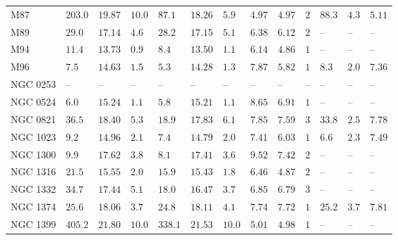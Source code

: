 \begin{table*}
\begin{center}
\begin{tabular}{lllllllllllll}
M87  \quad &  $203.0$  &  $19.87$  &  $10.0$  \quad \quad &  $87.1$  &  $18.26$  &  $5.9$  &  $4.97$  &  $4.97$  \quad \quad &  $2$  \quad \quad &  $88.3$  &  $4.3$  &  $5.11$  \\ 
M89  \quad &  $29.0$  &  $17.14$  &  $4.6$  \quad \quad &  $28.2$  &  $17.15$  &  $5.1$  &  $6.38$  &  $6.12$  \quad \quad &  $2$  \quad \quad &   -- &   -- &   --    \\ 
M94  \quad &  $11.4$  &  $13.73$  &  $0.9$  \quad \quad &  $8.4$  &  $13.50$  &  $1.1$  &  $6.14$  &  $4.86$  \quad \quad &  $1$  \quad \quad &   -- &   -- &   --    \\ 
M96  \quad &  $7.5$  &  $14.63$  &  $1.5$  \quad \quad &  $5.3$  &  $14.28$  &  $1.3$  &  $7.87$  &  $5.82$  \quad \quad &  $1$  \quad \quad &  $8.3$  &  $2.0$  &   $7.36$    \\ 
NGC 0253  \quad &   -- &   -- &   -- \quad \quad &   -- &   -- &   -- &   -- &   -- \quad \quad & 
 -- \quad \quad & 
 -- &   -- &   --    \\ 
NGC 0524  \quad &  $6.0$  &  $15.24$  &  $1.1$  \quad \quad &  $5.8$  &  $15.21$  &  $1.1$  &  $8.65$  &  $6.91$  \quad \quad &  $1$  \quad \quad &   -- &   -- &   --    \\ 
NGC 0821  \quad &  $36.5$  &  $18.40$  &  $5.3$  \quad \quad &  $18.9$  &  $17.83$  &  $6.1$  &  $7.85$  &  $7.59$  \quad \quad &  $3$  \quad \quad &  $33.8$  &  $2.5$  &  $7.78$  \\ 
NGC 1023  \quad &  $9.2$  &  $14.96$  &  $2.1$  \quad \quad &  $7.4$  &  $14.79$  &  $2.0$  &  $7.41$  &  $6.03$  \quad \quad &  $1$  \quad \quad &  $6.6$  &  $2.3$  &  $7.49$  \\ 
NGC 1300  \quad &  $9.9$  &  $17.62$  &  $3.8$  \quad \quad &  $8.1$  &  $17.41$  &  $3.6$  &  $9.52$  &  $7.42$  \quad \quad &  $2$  \quad \quad &   -- &   -- &   --    \\ 
NGC 1316  \quad &  $21.5$  &  $15.55$  &  $2.0$  \quad \quad &  $15.9$  &  $15.43$  &  $1.8$  &  $6.46$  &  $4.87$  \quad \quad &  $2$  \quad \quad &   -- &   -- &   --    \\ 
NGC 1332  \quad &  $34.7$  &  $17.44$  &  $5.1$  \quad \quad &  $18.0$  &  $16.47$  &  $3.7$  &  $6.85$  &  $6.79$  \quad \quad &  $3$  \quad \quad &   -- &   -- &   --    \\ 
NGC 1374  \quad &  $25.6$  &  $18.06$  &  $3.7$  \quad \quad &  $24.8$  &  $18.11$  &  $4.1$  &  $7.74$  &  $7.72$  \quad \quad &  $1$  \quad \quad &  $25.2$  &  $3.7$  &  $7.81$  \\ 
NGC 1399  \quad &  $405.2$  &  $21.80$  &  $10.0$  \quad \quad &  $338.1$  &  $21.53$  &  $10.0$  &  $5.01$  &  $4.98$  \quad \quad &  $1$  \quad \quad &   -- &   -- &   --    \\ 

\end{tabular}
\end{center}
\end{table*}
